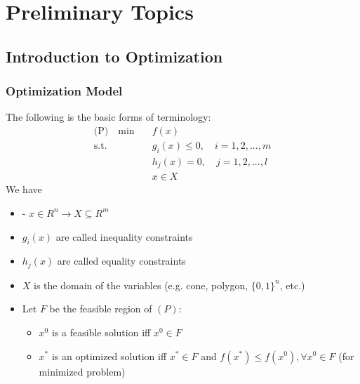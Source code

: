 \part{Preliminary Topics}
	\chapter{Introduction to Optimization}
		\section{Optimization Model}
			The following is the basic forms of terminology:
				\begin{align}
					\text{(P)} \quad \text{min} \quad & f(x)  \\
								\text{s.t.} \quad & g_i(x)\le 0, \quad i=1,2,...,m \\
											& h_j(x)=0, \quad j=1,2,...,l \\
											& x \in X 
				\end{align}
				We have
				\begin{itemize}
					\item - $x\in R^n \rightarrow X \subseteq R^m$
					\item $g_i(x)$ are called inequality constraints
					\item $h_j(x)$ are called equality constraints
					\item $X$ is the domain of the variables (e.g. cone, polygon, $\{0, 1\}^n$, etc.)
					\item Let $F$ be the feasible region of $(P)$:
					\begin{itemize}
						\item $x^0$ is a feasible solution iff $x^0\in F$
						\item $x^*$ is an optimized solution iff $x^* \in F$ and $f(x^*)\le f(x^0), \forall x^0 \in F$ (for minimized problem)
					\end{itemize}
				\end{itemize}


